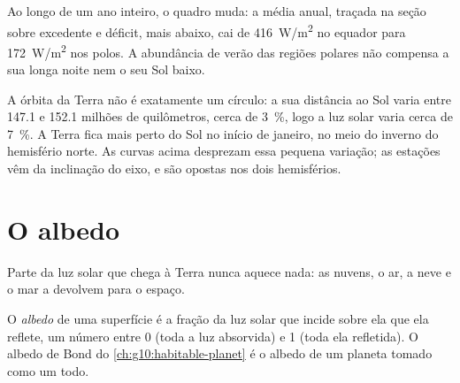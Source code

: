 Ao longo de um ano inteiro, o quadro muda: a  média anual,
traçada na seção sobre excedente e déficit, mais abaixo, cai de
\qty{416}{W/m^2} no equador para \qty{172}{W/m^2} nos polos. A abundância de
verão das regiões polares não compensa a sua longa noite nem o seu Sol
baixo.

\begin{remark}\label{rem:g10:earth-energy-budget:distance}
A órbita da Terra não é exatamente um círculo: a sua distância ao Sol varia
entre \num{147.1} e \num{152.1} milhões de quilômetros, cerca de
\qty{3}{\percent}, logo a luz solar varia cerca de \qty{7}{\percent}. A
Terra fica mais perto do Sol no início de janeiro, no meio do inverno do
hemisfério norte. As curvas acima desprezam essa pequena variação; as
estações vêm da inclinação do eixo, e são opostas nos dois hemisférios.
\end{remark}

\section{O albedo}

Parte da luz solar que chega à Terra nunca aquece nada: as nuvens, o ar, a
neve e o mar a devolvem para o espaço.

\begin{definition}[Albedo]\label{def:g10:earth-energy-budget:albedo}
O \emph{albedo} de uma superfície é a fração da luz solar que
incide sobre ela que ela reflete, um número entre 0 (toda a luz absorvida) e
1 (toda ela refletida). O albedo de Bond do \cref{ch:g10:habitable-planet}
é o albedo de um planeta tomado como um todo.
\end{definition}

